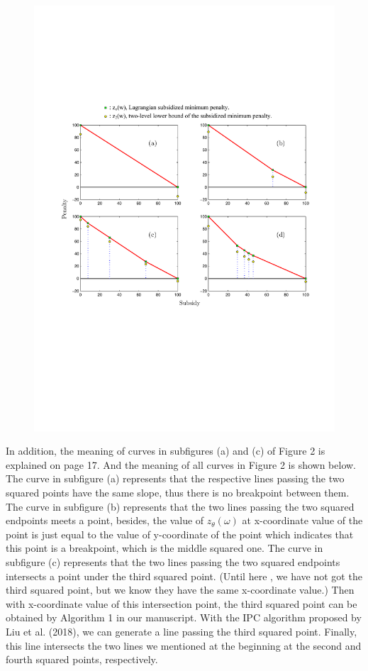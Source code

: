 \documentclass[11pt]{article}
\begin{document}
\begin{figure}[H]
\centering
\includegraphics[width=1\textwidth]{1.pdf}
\centering
\end{figure}
In addition, the meaning of curves in subfigures (a) and (c) of Figure 2 is explained on page 17.
And the meaning of all curves in Figure 2 is shown below. The curve in subfigure (a) represents that the respective lines passing the two squared points have the same slope, thus there is no breakpoint between them.
The curve in subfigure (b) represents that the two lines passing the two squared endpoints meets a point, besides, the value of $z_\theta(\omega)$ at x-coordinate value of the point is just equal to the value of y-coordinate of the point which indicates that this point is a breakpoint, which is the middle squared one. The curve in subfigure (c) represents that the two lines passing the two squared endpoints intersects a point under the third squared point. (Until here , we have not got the third squared point, but we know they have the same x-coordinate value.) Then with x-coordinate value of this intersection point, the third squared point can be obtained by Algorithm 1 in our manuscript. With the IPC algorithm proposed by Liu et al. (2018), we can generate a line passing the third squared point. Finally, this line intersects the two lines we mentioned at the beginning at the second and fourth squared points, respectively.
\end{document}
